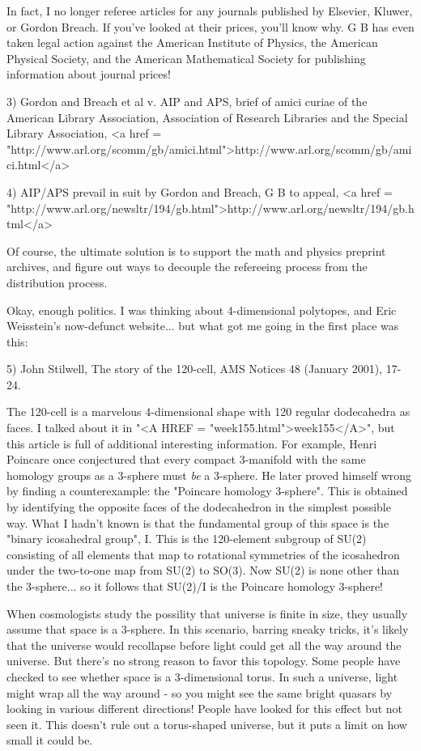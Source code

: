In fact, I no longer referee articles for any journals published by
Elsevier, Kluwer, or Gordon \text{\&}  Breach.  If you've looked at their prices,
you'll know why.  G\text{\&} B has even taken legal action against the American
Institute of Physics, the American Physical Society, and the American
Mathematical Society for publishing information about journal prices!

3) Gordon and Breach et al v. AIP and APS, brief of amici curiae of the
American Library Association, Association of Research Libraries and
the Special Library Association, <a href = "http://www.arl.org/scomm/gb/amici.html">http://www.arl.org/scomm/gb/amici.html</a>

4) AIP/APS prevail in suit by Gordon and Breach, G\text{\&} B to appeal,
<a href = "http://www.arl.org/newsltr/194/gb.html">http://www.arl.org/newsltr/194/gb.html</a>

Of course, the ultimate solution is to support the math and physics
preprint archives, and figure out ways to decouple the refereeing 
process from the distribution process.

Okay, enough politics.  I was thinking about 4-dimensional polytopes,
and Eric Weisstein's now-defunct website... but what got me going in the
first place was this:

5) John Stilwell, The story of the 120-cell, AMS Notices 48 (January 2001),
17-24.

The 120-cell is a marvelous 4-dimensional shape with 120 regular
dodecahedra as faces.  I talked about it in "<A HREF =
"week155.html">week155</A>", but this article is full of additional
interesting information.  For example, Henri Poincare once conjectured
that every compact 3-manifold with the same homology groups as a
3-sphere must \emph{be} a 3-sphere.  He later proved himself wrong by
finding a counterexample: the "Poincare homology 3-sphere".
This is obtained by identifying the opposite faces of the dodecahedron
in the simplest possible way.  What I hadn't known is that the
fundamental group of this space is the "binary icosahedral
group", I.  This is the 120-element subgroup of SU(2) consisting of
all elements that map to rotational symmetries of the icosahedron under
the two-to-one map from SU(2) to SO(3).  Now SU(2) is none other than
the 3-sphere... so it follows that SU(2)/I is the Poincare homology
3-sphere!

When cosmologists study the possility that universe is finite in size,
they usually assume that space is a 3-sphere.  In this scenario, 
barring sneaky tricks, it's likely that the universe would recollapse
before light could get all the way around the universe.   But there's no
strong reason to favor this topology.  Some people have checked to see
whether space is a 3-dimensional torus.  In such a universe, light might
wrap all the way around - so you might see the same bright quasars by
looking in various different directions!  People have looked for this
effect but not seen it.   This doesn't rule out a torus-shaped universe,
but it puts a limit on how small it could be.  


